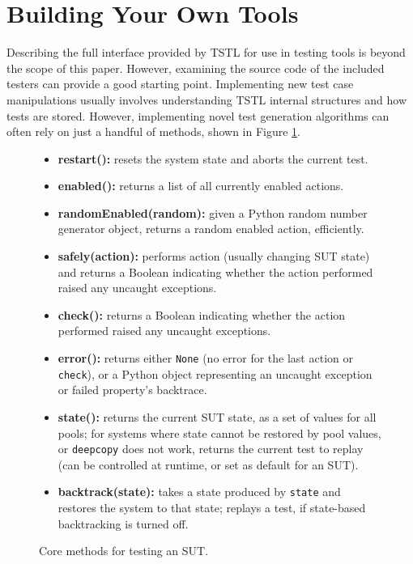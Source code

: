 \section{Building Your Own Tools}

Describing the full interface provided by TSTL for use in testing tools is beyond the scope of this paper.  However, examining the source code of the included testers can provide a good starting point.  Implementing new test case manipulations usually involves understanding TSTL internal structures and how tests are stored.  However, implementing novel test generation algorithms can often rely on just a handful of methods, shown in Figure \ref{methods}.

\begin{figure}
{\scriptsize
\begin{itemize}
\item {\bf restart():}  resets the system state and aborts the current test. 
\item {\bf enabled():} returns a list of all currently enabled actions.
\item {\bf randomEnabled(random):}  given a Python random number generator object, returns a random enabled action, efficiently.
\item {\bf safely(action):} performs action (usually changing SUT state)  and returns a Boolean indicating whether the action performed raised any uncaught exceptions. 
\item {\bf check():} returns a Boolean indicating whether the action performed raised any uncaught exceptions.
\item {\bf error():} returns either {\tt None} (no error for the last action or {\tt check}), or a Python object representing an uncaught exception or failed property's backtrace.
\item {\bf state():} returns the current SUT state, as a set of values for all pools; for systems where state cannot be restored by pool values, or {\tt deepcopy} does not work, returns the current test to replay (can be controlled at runtime, or set as default for an SUT).
\item {\bf backtrack(state):} takes a state produced by {\tt state} and restores the system to that state; replays a test, if state-based backtracking is turned off.
\end{itemize} 
}
\caption{Core methods for testing an SUT.}
\label{methods}
\end{figure}